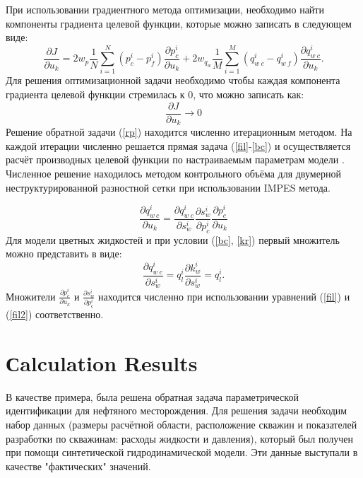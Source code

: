 \documentclass{article}
\begin{document}
При использовании градиентного метода оптимизации, необходимо найти компоненты градиента целевой функции, которые можно записать в следующем виде:
\begin{equation}
\frac{\partial J}{\partial u_k} = 2w_p\frac{1}{N}\sum_{i=1}^N ({p_c^i-p_f^i})\frac{\partial p_c^i}{\partial u_k}+2w_{q_w}\frac{1}{M}\sum_{i=1}^M{\left(q_{w\:c}^i-q_{w\:f}^i\right)}\frac{\partial q_{w\:c}^i}{\partial u_k}.
\end{equation}
Для решения оптимизационной задачи необходимо чтобы каждая компонента градиента целевой функции стремилась к 0, что можно записать как:
\begin{equation} \label{rp}
	 \frac{\partial J}{\partial u_k} \rightarrow 0
\end{equation}
Решение обратной задачи (\ref{rp}) находится численно итерационным методом. На каждой итерации численно решается прямая задача (\ref{fil}-\ref{bc}) и осуществляется расчёт производных целевой функции по настраиваемым параметрам модели \cite{opt}. Численное решение находилось методом контрольного объёма  для двумерной неструктурированной разностной сетки при использовании IMPES метода.

\begin{equation}
\frac{\partial q_{w\:c}^i}{\partial u_k} = \frac{\partial q_{w\:c}^i}{\partial s_w^i}\frac{\partial s_w^i}{\partial p_c^i}\frac{\partial p_c^i}{\partial u_k}
\end{equation}
Для модели цветных жидкостей и при условии (\ref{bc}, \ref{kr}) первый множитель можно представить в виде:
\begin{equation}
\frac{\partial q_{w\:c}^i}{\partial s_w^i} = q_l^i\frac{\partial k_{w}^i}{\partial s_w^i} = q_l^i.
\end{equation}
Множители $\frac{\partial p_c^i}{\partial u_k}$ и $\frac{\partial s_w^i}{\partial p_с^i}$ находится численно при использовании уравнений (\ref{fil}) и (\ref{fil2}) соответственно.
\section{Сalculation Results}
В качестве примера, была решена обратная задача параметрической идентификации для нефтяного месторождения. Для решения задачи необходим набор данных (размеры расчётной области, расположение скважин и показателей разработки по скважинам: расходы жидкости и давления), который был получен при помощи синтетической гидродинамической модели. Эти данные выступали в качестве "фактических" значений. 
\end{document}
